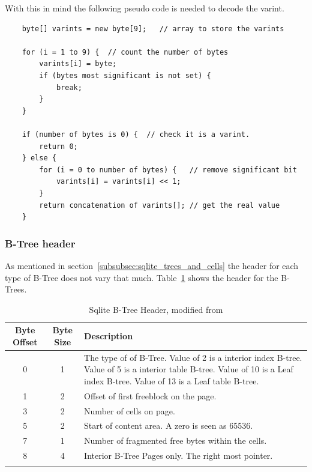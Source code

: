 With this in mind the following pseudo code is needed to decode the varint.

\begin{lstlisting}
	byte[] varints = new byte[9];	// array to store the varints

	for (i = 1 to 9) {	// count the number of bytes
		varints[i] = byte;
		if (bytes most significant is not set) {
			break;
		}
	}
	
	if (number of bytes is 0) {  // check it is a varint.
		return 0;
	} else {
		for (i = 0 to number of bytes) {   // remove significant bit
			varints[i] = varints[i] << 1;
		}
		return concatenation of varints[]; // get the real value
	}
\end{lstlisting}

\subsubsection{B-Tree header}
\label{subsubsec:btree_header}

As mentioned in section~\ref{subsubsec:sqlite_trees_and_cells} the header for each type of B-Tree does not vary that much. Table~\ref{tbl:btree_header} shows the header for the B-Trees.

\begin{longtable}[h]{| c | c | p{10cm} |}
		\hline
			\textbf{Byte Offset} & \textbf{Byte Size} & \textbf{Description} \\ 
		\hline
		\endhead
			0 & 1 & The type of of B-Tree. \newline
			Value of 2 is a interior index B-tree. \newline
			Value of 5 is a interior table B-tree. \newline
			Value of 10 is a Leaf index B-tree. \newline
			Value of 13 is a Leaf table B-tree. \\
		\hline
			1 & 2 & Offset of first freeblock on the page. \\
		\hline
			3 & 2 & Number of cells on page. \\
		\hline
			5 & 2 & Start of content area. A zero is seen as 65536. \\
		\hline
			7 & 1 & Number of fragmented free bytes within the cells. \\
		\hline
			8 & 4 & Interior B-Tree Pages only. The right most pointer. \\ 
		\hline
	\caption{Sqlite B-Tree Header, modified from \cite{sqlite}}
	\label{tbl:btree_header}
\end{longtable}

